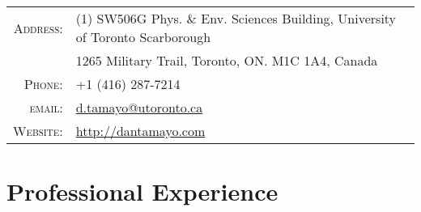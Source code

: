 \documentclass[10pt]{article} %
\begin{document}
\pagestyle{empty} %


\par{\bigskip\par} %

\section{}

\begin{tabular}{rl}
\textsc{Address:} & (1) SW506G Phys. \& Env. Sciences Building, University of Toronto Scarborough \\
& 1265 Military Trail, Toronto, ON. M1C 1A4, Canada \\
\textsc{Phone:} & +1 (416) 287-7214 \\
\textsc{email:} &  \href{mailto:d.tamayo@utoronto.ca}{d.tamayo@utoronto.ca} \\
\textsc{Website:} & \href{http://dantamayo.com}{http://dantamayo.com} \\
\end{tabular}


\section{Professional Experience}
\end{document}
